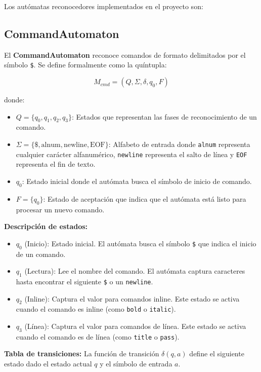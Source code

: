 Los autómatas reconocedores implementados en el proyecto son:

\subsection{CommandAutomaton}

El \textbf{CommandAutomaton} reconoce comandos de formato delimitados por el símbolo \texttt{\$}. Se define formalmente como la quíntupla:

\[
M_{cmd} = (Q, \Sigma, \delta, q_0, F)
\]

donde:
\begin{itemize}
    \item $Q = \{q_0, q_1, q_2, q_3\}$: Estados que representan las fases de reconocimiento de un comando.
    \item $\Sigma = \{\$, \text{alnum}, \text{newline}, \text{EOF}\}$: Alfabeto de entrada donde \texttt{alnum} representa cualquier carácter alfanumérico, \texttt{newline} representa el salto de línea y \texttt{EOF} representa el fin de texto.
    \item $q_0$: Estado inicial donde el autómata busca el símbolo de inicio de comando.
    \item $F = \{q_0\}$: Estado de aceptación que indica que el autómata está listo para procesar un nuevo comando.
\end{itemize}

\textbf{Descripción de estados:}
\begin{itemize}
    \item $q_0$ (Inicio): Estado inicial. El autómata busca el símbolo \texttt{\$} que indica el inicio de un comando.
    \item $q_1$ (Lectura): Lee el nombre del comando. El autómata captura caracteres hasta encontrar el siguiente \texttt{\$} o un \texttt{newline}.
    \item $q_2$ (Inline): Captura el valor para comandos inline. Este estado se activa cuando el comando es inline (como \texttt{bold} o \texttt{italic}).
    \item $q_3$ (Línea): Captura el valor para comandos de línea. Este estado se activa cuando el comando es de línea (como \texttt{title} o \texttt{pass}).
\end{itemize}

\textbf{Tabla de transiciones:} La función de transición $\delta(q, a)$ define el siguiente estado dado el estado actual $q$ y el símbolo de entrada $a$.

